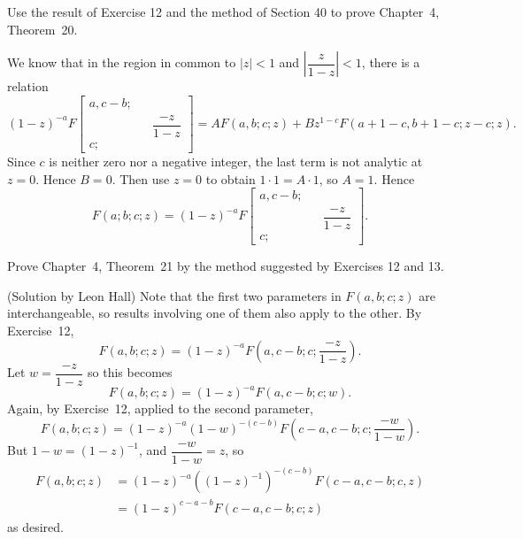 \begin{problem}\label{problem13chapter4}
Use the result of Exercise 12 and the method of Section 40 to prove Chapter~4, Theorem~20. 
\end{problem}
\begin{solution}
We know that in the region in common to $|z|<1$ and $\left| \dfrac{z}{1-z} \right| < 1$, there is a relation
$$(1-z)^{-a} F \left[ \begin{array}{rlr}
a,c-b; & & \\
& & \dfrac{-z}{1-z} \\
c; & & 
\end{array} \right] = AF(a,b;c;z) + Bz^{1-c}F(a+1-c,b+1-c;z-c;z).$$
Since $c$ is neither zero nor a negative integer, the last term is not analytic at $z=0$. Hence $B=0$. Then use $z=0$ to obtain $1 \cdot 1 = A \cdot 1$, so $A = 1$. Hence
$$F(a;b;c;z) = (1-z)^{-a} F \left[ \begin{array}{rlr}
a,c-b; & & \\
& & \dfrac{-z}{1-z} \\
c; & & 
\end{array} \right].$$
\end{solution}
\begin{problem}\label{problem14chapter4}
Prove Chapter~4, Theorem~21 by the method suggested by Exercises 12 and 13. 
\end{problem}
\begin{solution}(Solution by Leon Hall)
Note that the first two parameters in $F(a,b;c;z)$ are interchangeable, so results involving one of them also apply to the other. By Exercise~12,
$$F(a,b;c;z) = (1-z)^{-a} F \left( a,c-b;c; \dfrac{-z}{1-z} \right).$$
Let $w = \dfrac{-z}{1-z}$ so this becomes
$$F(a,b;c;z) = (1-z)^{-a} F(a,c-b;c;w).$$
Again, by Exercise~12, applied to the second parameter,
$$F(a,b;c;z) = (1-z)^{-a}(1-w)^{-(c-b)}F \left(c-a,c-b;c; \dfrac{-w}{1-w} \right).$$
But $1-w=(1-z)^{-1}$, and $\dfrac{-w}{1-w} = z$, so
$$\begin{array}{ll}
F(a,b;c;z) &= (1-z)^{-a}((1-z)^{-1})^{-(c-b)}F(c-a,c-b;c,z) \\
&=(1-z)^{c-a-b}F(c-a,c-b;c;z)
\end{array}$$
as desired.
\end{solution}
